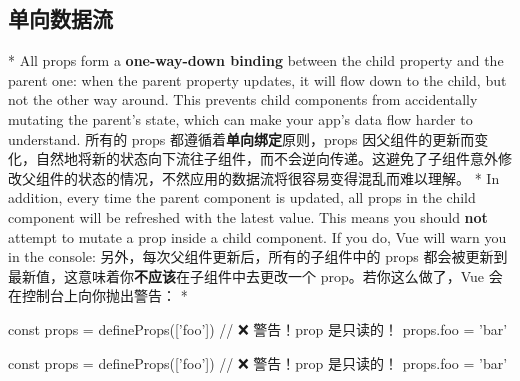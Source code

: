 \begin{paracol}{2}
\subsection{单向数据流}
\switchcolumn[0]*%
All props form a \textbf{one-way-down binding} between the child
property and the parent one: when the parent property updates, it will
flow down to the child, but not the other way around. This prevents
child components from accidentally mutating the parent's state, which
can make your app's data flow harder to understand.
\switchcolumn
所有的 props 都遵循着\textbf{单向绑定}原则，props
因父组件的更新而变化，自然地将新的状态向下流往子组件，而不会逆向传递。这避免了子组件意外修改父组件的状态的情况，不然应用的数据流将很容易变得混乱而难以理解。
\switchcolumn[0]*%
In addition, every time the parent component is updated, all props in
the child component will be refreshed with the latest value. This means
you should \textbf{not} attempt to mutate a prop inside a child
component. If you do, Vue will warn you in the console:
\switchcolumn
另外，每次父组件更新后，所有的子组件中的 props
都会被更新到最新值，这意味着你\textbf{不应该}在子组件中去更改一个
prop。若你这么做了，Vue 会在控制台上向你抛出警告：
\switchcolumn[0]*%
\begin{codeJs}
const props = defineProps(['foo'])
// ❌ 警告！prop 是只读的！
props.foo = 'bar'
\end{codeJs}
\switchcolumn
\begin{codeJs}
const props = defineProps(['foo'])
// ❌ 警告！prop 是只读的！
props.foo = 'bar'
\end{codeJs}


\end{paracol}
